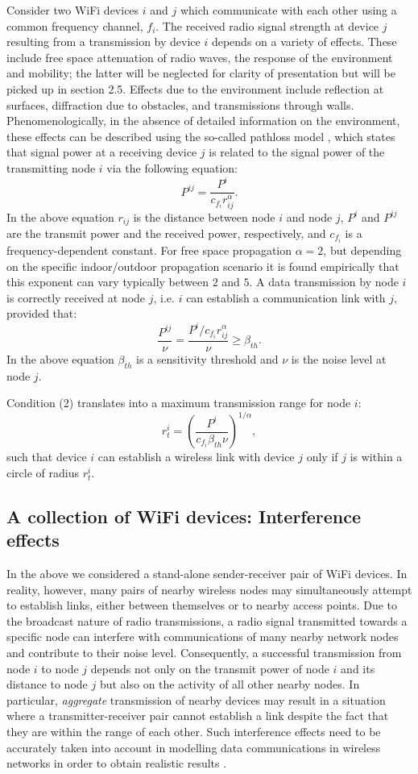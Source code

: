 \documentclass{elsart}
\newcommand{\be}{\begin{equation}}
\newcommand{\ee}{\end{equation}}
\begin{document}
Consider two WiFi devices $i$ and $j$ which communicate with each
other  using a common frequency channel, $f_i$. The received radio signal 
strength at device $j$ resulting from  a transmission by device $i$
depends on  a variety of effects. These include free space attenuation of 
radio waves, the response of the environment and mobility; 
the latter will be neglected for clarity of presentation but will 
be picked up in section 2.5. Effects due to the environment include
reflection at surfaces, diffraction due to obstacles, and transmissions 
through walls. Phenomenologically, in the absence of detailed information on 
the environment, these effects can be  described using the so-called pathloss 
model \cite{pathloss},  which states that signal power at a receiving device $j$ is related 
to the signal power of the transmitting node $i$  via the following 
equation:
\be
P^{ij}=\frac{P^i}{c_{f_i}r_{ij}^\alpha}.
\ee
In the above equation 
$r_{ij}$ is the distance between node $i$ and node $j$, 
$P^{i}$ and $P^{ij}$ are the transmit power and the received power, 
respectively, and $c_{f_i}$ is a frequency-dependent 
constant. 
For free space propagation $\alpha=2$, but depending on the specific 
indoor/outdoor propagation scenario it is found empirically 
that this exponent can vary
typically between $2$ and $5$. A data transmission by node $i$ is correctly 
received at node $j$, i.e. $i$ can establish a communication link with 
$j$, provided that: 
\be
\frac{P^{ij}}{\nu}= \frac{P^i/c_{f_i}r_{ij}^\alpha}{\nu} \ge \beta_{th}.  
\ee
In the above equation 
$\beta_{th}$ is a sensitivity threshold and $\nu$ is the noise level at 
node $j$.

Condition (2) translates into a maximum transmission range for node $i$:
\be
r_t^i= \left( \frac{P^i}{c_{f_i} \beta_{th} \nu} \right)^{1/\alpha},
\ee
such that device $i$  can establish a wireless link with device $j$
only if $j$ is within a circle of radius $r_t^i$. 

\subsection{A collection of WiFi devices: Interference effects}
In the above we considered a stand-alone sender-receiver 
pair of WiFi devices. In reality, however, many pairs of nearby 
wireless nodes may simultaneously attempt to establish links, 
either between themselves or to 
nearby access points.  Due to the broadcast nature of radio transmissions, 
a radio signal transmitted towards a specific node can interfere with communications of many nearby network nodes and contribute to their noise 
level. Consequently, a successful transmission from 
node $i$ to node $j$ depends not only on the transmit power of node $i$ and 
its distance to node $j$ but also on the activity of all other 
nearby nodes. 
In particular, {\it aggregate} transmission
of nearby devices may result in a situation where a transmitter-receiver pair 
cannot establish a link despite the fact that they are within the  range of each other.
Such interference effects need to be accurately taken into account in 
modelling data communications in wireless networks in order 
to obtain realistic results \cite{bogodia1}.
\end{document}
